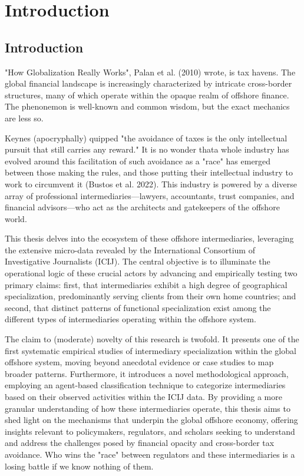 \chapter{Introduction}
\label{chap:introduction}

\section{Introduction} 
\label{sec:1_0}

"How Globalization Really Works", Palan et al. (2010) wrote, is tax havens. The global financial landscape is increasingly characterized by intricate cross-border structures, many of which operate within the opaque realm of offshore finance. The phenonemon is well-known and common wisdom, but the exact mechanics are less so.

Keynes (apocryphally) quipped "the avoidance of taxes is the only intellectual pursuit that still carries any reward." It is no wonder thata whole industry has evolved around this facilitation of such avoidance as a "race" has emerged between those making the rules, and those putting their intellectual industry to work to circumvent it (Bustos et al. 2022). This industry is powered by a diverse array of professional intermediaries—lawyers, accountants, trust companies, and financial advisors—who act as the architects and gatekeepers of the offshore world.

This thesis delves into the ecosystem of these offshore intermediaries, leveraging the extensive micro-data revealed by the International Consortium of Investigative Journalists (ICIJ). The central objective is to illuminate the operational logic of these crucial actors by advancing and empirically testing two primary claims: first, that intermediaries exhibit a high degree of geographical specialization, predominantly serving clients from their own home countries; and second, that distinct patterns of functional specialization exist among the different types of intermediaries operating within the offshore system.

The claim to (moderate) novelty of this research is twofold. It presents one of the first systematic empirical studies of intermediary specialization within the global offshore system, moving beyond anecdotal evidence or case studies to map broader patterns. Furthermore, it introduces a novel methodological approach, employing an agent-based classification technique to categorize intermediaries based on their observed activities within the ICIJ data. By providing a more granular understanding of how these intermediaries operate, this thesis aims to shed light on the mechanisms that underpin the global offshore economy, offering insights relevant to policymakers, regulators, and scholars seeking to understand and address the challenges posed by financial opacity and cross-border tax avoidance. Who wins the "race" between regulators and these intermediaries is a losing battle if we know nothing of them.

